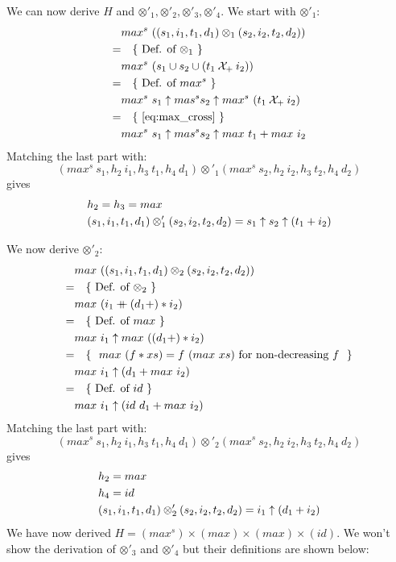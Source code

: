 \documentclass{article}
\begin{document}
We can now derive $H$ and $\otimes'_1 , \otimes'_2 , \otimes'_3 , \otimes'_4$.
We start with $\otimes'_1$:
\begin{align*}
      & max^s\ ((s_1,i_1,t_1,d_1) \otimes_1 (s_2,i_2,t_2,d_2))          \\
    = & \quad \{\ \text{Def. of $\otimes_1$}\ \}                        \\
      & max^s\ (s_1 \cup s_2 \cup (t_1 \crossop_{+} i_2))                \\
    = & \quad \{\ \text{Def. of $max^s$}\ \}                            \\
      & max^s\ s_1 \maxop mas^s s_2 \maxop max^s\ (t_1 \crossop_{+} i_2) \\
    = & \quad \{\ \eqref{eq:max_cross}\ \}                              \\
      & max^s\ s_1 \maxop mas^s s_2 \maxop max\ t_1 + max\ i_2          \\
\end{align*}
Matching the last part with:
\[
    (max^s\ s_1, h_2\ i_1, h_3\ t_1, h_4\ d_1) \otimes'_1
    (max^s\ s_2, h_2\ i_2, h_3\ t_2, h_4\ d_2)
\]
gives
\begin{align*}
    & h_2 = h_3 = max \\
    & (s_1, i_1, t_1, d_1) \otimes'_1
      (s_2, i_2, t_2, d_2)
    = s_1 \uparrow s_2 \uparrow (t_1 + i_2)
\end{align*}

We now derive $\otimes'_2$:
\begin{align*}
      & max\ ((s_1,i_1,t_1,d_1) \otimes_2 (s_2,i_2,t_2,d_2))    \\
    = & \quad \{\ \text{Def. of $\otimes_2$}\ \}                \\
      & max\ (i_1 \mathbin{+\mkern-10mu+} (d_1 +) \mathbin{\ast} i_2)                     \\
    = & \quad \{\ \text{Def. of $max$}\ \}                      \\
      & max\ i_1 \uparrow max\ ((d_1 +) \mathbin{\ast} i_2)                 \\
    = & \quad \{\ \text{
            $max\ (f \mathbin{\ast} xs) = f\ (max\ xs)$
            for non-decreasing $f$
        }\ \}                                                   \\
      & max\ i_1 \uparrow (d_1 + max\ i_2)                        \\
    = & \quad \{\ \text{Def. of $id$}\ \}                       \\
      & max\ i_1 \uparrow (id\ d_1 + max\ i_2)                    \\
\end{align*}
Matching the last part with:
\[
    (max^s\ s_1, h_2\ i_1, h_3\ t_1, h_4\ d_1) \otimes'_2
    (max^s\ s_2, h_2\ i_2, h_3\ t_2, h_4\ d_2)
\]
gives
\begin{align*}
    & h_2 = max \\
    & h_4 = id  \\
    & (s_1, i_1, t_1, d_1) \otimes'_2
      (s_2, i_2, t_2, d_2)
    = i_1 \uparrow (d_1 + i_2)
\end{align*}
We have now derived $H = (max^s) \times (max) \times (max) \times (id)$.
We won't show the derivation of $\otimes'_3$ and $\otimes'_4$ but their
definitions are shown below:
\end{document}
